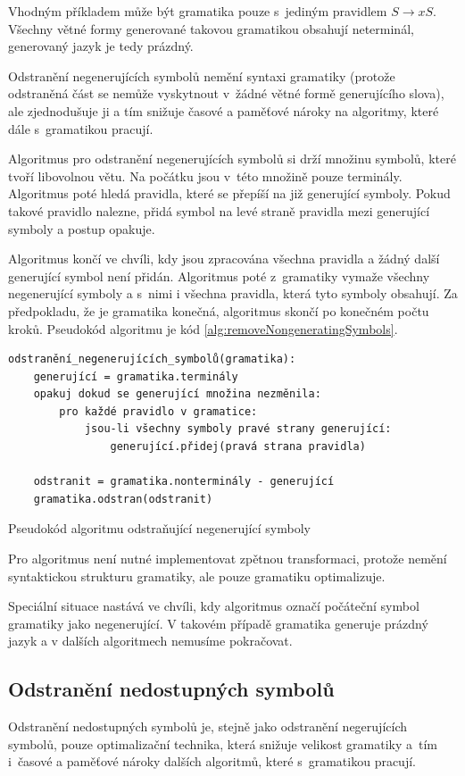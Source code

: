 	Vhodným příkladem může být gramatika pouze s~jediným pravidlem $S \rightarrow x S$. Všechny větné formy generované takovou gramatikou obsahují neterminál, generovaný jazyk je tedy prázdný.
	
	Odstranění negenerujících symbolů nemění syntaxi gramatiky (protože odstraněná část se nemůže vyskytnout v~žádné větné formě generujícího slova), ale zjednodušuje ji a tím snižuje časové a paměťové nároky na algoritmy, které dále s~gramatikou pracují.
	
	Algoritmus pro odstranění negenerujících symbolů si drží množinu symbolů, které tvoří libovolnou větu. Na počátku jsou v~této množině pouze terminály. Algoritmus poté hledá pravidla, které se přepíší na již generující symboly. Pokud takové pravidlo nalezne, přidá symbol na levé straně pravidla mezi generující symboly a postup opakuje.
	
	Algoritmus končí ve chvíli, kdy jsou zpracována všechna pravidla a žádný další generující symbol není přidán. Algoritmus poté z~gramatiky vymaže všechny negenerující symboly a s~nimi i všechna pravidla, která tyto symboly obsahují. Za předpokladu, že je gramatika konečná, algoritmus skončí po konečném počtu kroků. Pseudokód algoritmu je kód \ref{alg:removeNongeneratingSymbols}.
	
	\begin{listing}[h]
		\begin{verbatim}
odstranění_negenerujících_symbolů(gramatika):
	generující = gramatika.terminály
	opakuj dokud se generující množina nezměnila:
		pro každé pravidlo v gramatice:
			jsou-li všechny symboly pravé strany generující:
				generující.přidej(pravá strana pravidla)

	odstranit = gramatika.nonterminály - generující
	gramatika.odstran(odstranit)
		\end{verbatim}
		\caption{Pseudokód algoritmu odstraňující negenerující symboly}
		\label{alg:removeNongeneratingSymbols}
	\end{listing}
	
	Pro algoritmus není nutné implementovat zpětnou transformaci, protože nemění syntaktickou strukturu gramatiky, ale pouze gramatiku optimalizuje.
	
	Speciální situace nastává ve chvíli, kdy algoritmus označí počáteční symbol gramatiky jako negenerující. V takovém případě gramatika generuje prázdný jazyk a v dalších algoritmech nemusíme pokračovat.
	
	\subsection{Odstranění nedostupných symbolů}
	Odstranění nedostupných symbolů je, stejně jako odstranění negerujících symbolů, pouze optimalizační technika, která snižuje velikost gramatiky a~tím i~časové a paměťové nároky  dalších algoritmů, které s~gramatikou pracují.
	
